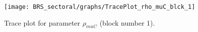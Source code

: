 \begin{figure}[H]
\centering
  \texttt{[image: BRS\_sectoral/graphs/TracePlot\_rho\_muC\_blck\_1]}\\
    \caption{Trace plot for parameter ${\rho_{muC}}$ (block number 1).}
\end{figure}
